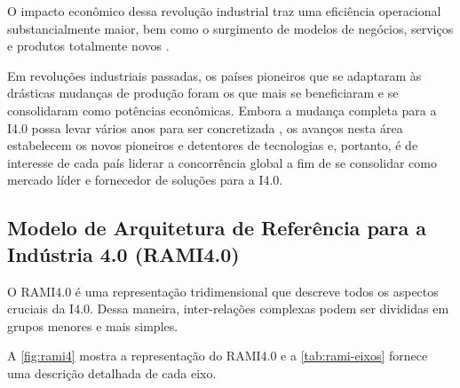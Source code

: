 O impacto econômico dessa revolução industrial traz uma eficiência operacional substancialmente maior, bem como o surgimento de modelos de negócios, serviços e produtos totalmente novos \cite{hermann2016design}.

Em revoluções industriais passadas, os países pioneiros que se adaptaram às drásticas mudanças de produção foram os que mais se beneficiaram e se consolidaram como potências econômicas. Embora a mudança completa para a I4.0 possa levar vários anos para ser concretizada \cite{russmann2015industryfour}, os avanços nesta área estabelecem os novos pioneiros e detentores de tecnologias e, portanto, é de interesse de cada país liderar a concorrência global a fim de se consolidar como mercado líder e fornecedor de soluções para a I4.0.

\subsection{Modelo de Arquitetura de Referência para a Indústria 4.0 (RAMI4.0)}
\label{sub:rami4}

O RAMI4.0 é uma representação tridimensional que descreve todos os aspectos cruciais da I4.0. Dessa maneira, inter-relações complexas podem ser divididas em grupos menores e mais simples.

A \autoref{fig:rami4} mostra a representação do RAMI4.0 e a \autoref{tab:rami-eixos} fornece uma descrição detalhada de cada eixo.


